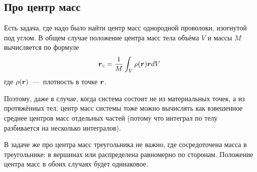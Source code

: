\documentclass[a4paper,12pt]{article}
\begin{document}
  \subsection{Про центр масс}
  
  Есть задача, где надо было найти центр масс однородной проволоки, изогнутой под углом.
  В общем случае положение центра масс тела объёма $V$ и массы $M$ вычисляется по формуле
  \[
    \boldsymbol r_c = \frac{1}{M} \int_V \rho(\boldsymbol r) \boldsymbol r dV
  \]
  где $\rho(\boldsymbol r)$~---~плотность в точке $\boldsymbol r$.
  
  Поэтому, даже в случае, когда система состоит не из материальных точек, а из протяжённых тел, центр масс системы тоже можно вычислять как взвешенное среднее центров масс отдельных частей (потому что интеграл по телу разбивается на несколько интегралов).
  
  В задаче же про центра масс треугольника не важно, где сосредоточена масса в треугольнике: в вершинах или распределена равномерно по сторонам.
  Положение центра масс в обоих случаях будет одинаковое.
\end{document}
